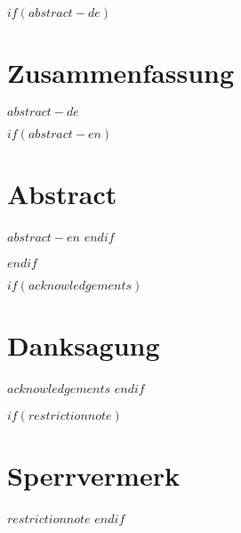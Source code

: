 
$if(abstract-de)$
\cleardoublepage
\begin{minipage}{\linewidth}

\chapter*{Zusammenfassung}
$abstract-de$

$if(abstract-en)$
\chapter*{Abstract}
$abstract-en$
$endif$

\end{minipage}
\cleardoublepage
$endif$



$if(acknowledgements)$
\chapter*{Danksagung}
$acknowledgements$
$endif$



$if(restrictionnote)$
\chapter*{Sperrvermerk}
$restrictionnote$
$endif$
